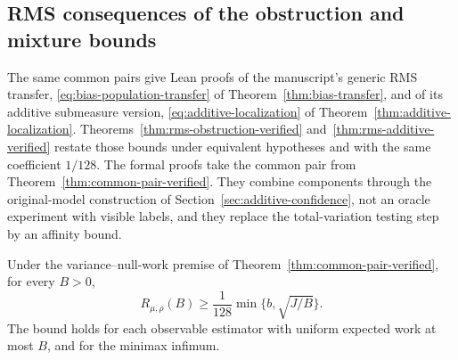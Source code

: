 \clearpage
\subsection{RMS consequences of the obstruction and mixture bounds}
\label{sec:rms-localization}

The same common pairs give Lean proofs of the manuscript's generic RMS
transfer, \eqref{eq:bias-population-transfer} of
Theorem~\ref{thm:bias-transfer}, and of its additive submeasure version,
\eqref{eq:additive-localization} of
Theorem~\ref{thm:additive-localization}.
Theorems~\ref{thm:rms-obstruction-verified}
and~\ref{thm:rms-additive-verified} restate those bounds under equivalent
hypotheses and with the same coefficient $1/128$. The formal proofs take
the common pair from Theorem~\ref{thm:common-pair-verified}. They combine
components through the original-model construction of
Section~\ref{sec:additive-confidence}, not an oracle experiment with
visible labels, and they replace the total-variation testing step by an
affinity bound.

\begin{theorem}
\label{thm:rms-obstruction-verified}
Under the variance--null-work premise of
Theorem~\ref{thm:common-pair-verified}, for every $B>0$,
\[
 R_{\mu,\rho}(B)\ge
 \frac1{128}\min\{b,\sqrt{J/B}\}.
\]
The bound holds for each observable estimator with uniform expected
work at most $B$, and for the minimax infimum.
\end{theorem}

